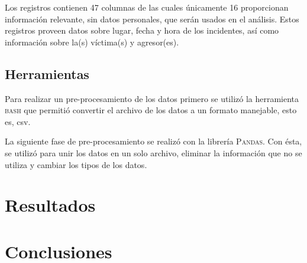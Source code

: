 \documentclass[final,5p,times]{elsarticle}
\begin{document}
Los registros contienen 47 columnas de las cuales \'unicamente 16 proporcionan informaci\'on relevante, sin datos personales, que ser\'an usados en el an\'alisis. Estos registros proveen datos sobre lugar, fecha y hora de los incidentes, as\'i como informaci\'on sobre la(s) v\'ictima(s) y agresor(es).  

\subsection*{Herramientas}

Para realizar un pre-procesamiento de los datos primero se utiliz\'o la herramienta \textsc{bash} que permiti\'o convertir el archivo de los datos a un formato manejable, esto es, csv.

La siguiente fase de pre-procesamiento se realiz\'o con la librer\'ia \textsc{Pandas}. Con \'esta, se utiliz\'o para unir los datos en un solo archivo, eliminar la informaci\'on que no se utiliza y cambiar los tipos de los datos. 

\section{Resultados} \label{resultados}

\section{Conclusiones} \label{conclusiones}






\begin{thebibliography}{00}



\end{thebibliography}
\end{document}

